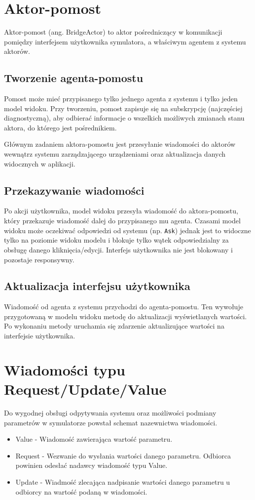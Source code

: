 {\section{Aktor-pomost} \label{sec:aktor-pomost}
Aktor-pomost (ang. BridgeActor) to aktor pośredniczący w komunikacji pomiędzy interfejsem użytkownika symulatora, a właściwym agentem z systemu aktorów. 

\subsection*{Tworzenie agenta-pomostu}
Pomost może mieć przypisanego tylko jednego agenta z systemu i tylko jeden model widoku. Przy tworzeniu, pomost zapisuje się na subskrypcję (najczęściej diagnostyczną), aby odbierać informacje o wszelkich możliwych zmianach stanu aktora, do którego jest pośrednikiem.


Głównym zadaniem aktora-pomostu jest przesyłanie wiadomości do aktorów wewnątrz systemu zarządzającego urządzeniami oraz aktualizacja danych widocznych w aplikacji.

\subsection*{Przekazywanie wiadomości}

Po akcji użytkownika, model widoku przesyła wiadomość do aktora-pomostu, który przekazuje wiadomość dalej do przypisanego mu agenta. Czasami model widoku może oczekiwać odpowiedzi od systemu (np. \lstinline{Ask}) jednak jest to widoczne tylko na poziomie widoku modelu i blokuje tylko wątek odpowiedzialny za obsługę danego kliknięcia/edycji. Interfejs użytkownika nie jest blokowany i pozostaje responsywny.

\subsection*{Aktualizacja interfejsu użytkownika}

Wiadomość od agenta z systemu przychodzi do agenta-pomostu. Ten wywołuje przygotowaną w modelu widoku metodę do aktualizacji wyświetlanych wartości.
Po wykonaniu metody uruchamia się zdarzenie aktualizujące wartości na interfejsie użytkownika.

\section{Wiadomości typu Request/Update/Value}
Do wygodnej obsługi odpytywania systemu oraz możliwości podmiany parametrów w symulatorze powstał schemat nazewnictwa wiadomości.
\begin{itemize}
    \item Value - Wiadomość zawierająca wartość parametru.
    \item Request - Wezwanie do wysłania wartości danego parametru. Odbiorca powinien odesłać nadawcy wiadomość typu Value.
    \item Update - Wiadmość zlecająca nadpisanie wartości danego parametru u odbiorcy na wartość podaną w wiadomości.
\end{itemize}


}
